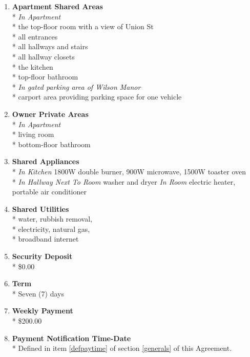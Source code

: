 \documentclass[12pt,letterpaper]{article}
\newcommand{\condo}{Wilson Manor}
\newcommand{\apt}{Apartment}
\newcommand{\room}{Room}
\newcommand{\shared}{Apartment Shared Areas}
\newcommand{\livingroom}{Owner Private Areas}
\newcommand{\appliances}{Shared Appliances}
\newcommand{\utilities}{Shared Utilities}
\newcommand{\deposit}{Security Deposit}
\newcommand{\rent}{Weekly Payment}
\newcommand{\paymenttime}{Payment Notification Time-Date}
\begin{document}
\begin{multicols}{2}
\begin{enumerate}
			\item \textbf{\shared{}}\\* \label{shared}
				\textit{In \apt{}}\\*
				the top-floor room with a view of Union St\\*
				all entrances\\*
				all hallways and stairs\\*
				all hallway closets\\*
				the kitchen\\*
				top-floor bathroom\\*
				\textit{In gated parking area of \condo{}}\\*
				carport area providing parking space for one vehicle
				
			\item \textbf{\livingroom{}}\\* \label{livingroom}
				\textit{In \apt{}}\\*
				living room\\*
				bottom-floor bathroom
				
			\item \textbf{\appliances}\\* \label{appliances}
				\textit{In Kitchen} 1800W double burner,
				900W microwave,
				1500W toaster oven\\*
				\textit{In Hallway Next To \room{}} washer and dryer
				\textit{In \room{}} electric heater,
				portable air conditioner
				
			\item \textbf{\utilities{}}\\* \label{utilities}
				water,
				rubbish removal,\\*
				electricity,
				natural gas,\\*
				broadband internet

			\item \textbf{\deposit{}}\\* \label{deposit}
				\$0.00

			\item \textbf{Term}\\*
				Seven (7) days

			\item \textbf{\rent{}}\\* \label{rent}
				\$200.00

			\item \textbf{\paymenttime{}}\\* \label{paymenttime}
				Defined in item \ref{defpaytime} of section \ref{generals} of this Agreement.


\end{enumerate}
\end{multicols}
\end{document}
